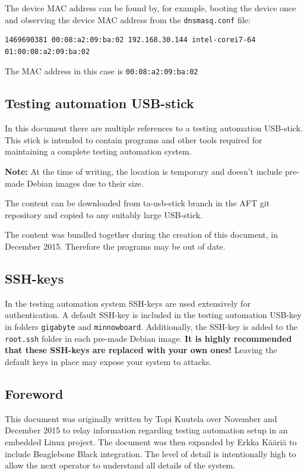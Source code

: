 \documentclass[a4paper,11pt]{article}
\newcommand{\note}{\textbf{Note: }}
\newcommand{\cmd}[1]{\texttt{#1}}
\begin{document}
\begin{enumerate}
The device MAC address can be found by, for example, booting the device once and observing the device MAC address from the \cmd{dnsmasq.conf} file:

\begin{lstlisting}
1469690381 00:08:a2:09:ba:02 192.168.30.144 intel-corei7-64 01:00:08:a2:09:ba:02
\end{lstlisting}

The MAC address in this case is \cmd{00:08:a2:09:ba:02}

\end{enumerate}



\subsection{Testing automation USB-stick}
In this document there are multiple references to a testing automation USB-stick. This stick is intended to contain programs and other tools required for maintaining a complete testing automation system.

\note{At the time of writing, the location is temporary and doesn't include pre-made Debian images due to their size.}

The content can be downloaded from ta-usb-stick branch in the AFT git repository and copied to any suitably large USB-stick.

The content was bundled together during the creation of this document, in December 2015. Therefore the programs may be out of date.

\subsection{SSH-keys}
In the testing automation system SSH-keys are used extensively for authentication. A default SSH-key is included in the testing automation USB-key in folders \cmd{gigabyte} and \cmd{minnowboard}. Additionally, the SSH-key is added to the \cmd{\/root\/.ssh} folder in each pre-made Debian image. \textbf{It is highly recommended that these SSH-keys are replaced with your own ones!} Leaving the default keys in place may expose your system to attacks.

\subsection{Foreword}
This document was originally written by Topi Kuutela over November and December 2015 to relay information regarding testing automation setup in an embedded Linux project. The document was then expanded by Erkka Kääriä to include Beaglebone Black integration. The level of detail is intentionally high to allow the next operator to understand all details of the system. 
\end{document}
